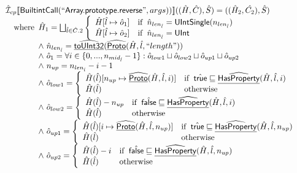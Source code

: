 \documentclass{article}
\newcommand{\SF}[1]{\mbox{\textsf{#1}}}
\newcommand{\wherec}[1]{{\rm where}\begin{array}[t]{l}#1\end{array}}
\newcommand{\ifc}[1]{{\rm if}\begin{array}[t]{l}#1\end{array}}
\newcommand{\owc}{{\rm otherwise}}
\newcommand{\aI}{\hat{\mathcal{I}}}
\newcommand{\lbr}{\llbracket}
\newcommand{\rbr}{\rrbracket}
\newcommand{\ahf}[1]{\widehat{\underline{\sf #1}}}
\newcommand{\atrue}{\hat{\SF{true}}}
\newcommand{\afalse}{\hat{\SF{false}}}
\begin{document}
\[\begin{array}{ll}
\aI _{cp}\lbr \SF{BuiltintCall}(``\SF{Array.prototype.reverse}",args))\rbr((\hat{H},\hat{C}), \hat{S})
  = ((\hat{H}_2, \hat{C_2}), \hat{S})\\
\quad\wherec{
  \hat{H}_1 = \bigsqcup_{\hat{l} \in \hat{C}.2}  \left\{\begin{array}{ll}
      \hat{H}[\hat{l} \mapsto \hat{o}_1] & \ifc{\hat{n}_{len_{\hat{l}}} = \SF{UIntSingle}(n_{len_{\hat{l}}})}\\
      \hat{H}[\hat{l} \mapsto \hat{o}_2] &  \ifc{\hat{n}_{len_{\hat{l}}} = \SF{UInt}}\\
    \end{array}\right.\\
  \land\ \hat{n}_{len_{\hat{l}}} = \ahf{toUInt32}(\ahf{Proto}(\hat{H}, \hat{l}, ``length"))\\
  \land\ \hat{o}_1 = \forall i \in \{0,..., n_{mid_{\hat{l}}}-1\}: \hat{o}_{low1} \sqcup\hat{o}_{low2} \sqcup\hat{o}_{up1} \sqcup\hat{o}_{up2}\\
  \land\ n_{up} = n_{len_{\hat{l}}} - i - 1\\
  \land\ \hat{o}_{low1} = \left\{\begin{array}{ll}
      \hat{H}(\hat{l})[n_{up} \mapsto \ahf{Proto}(\hat{H}, \hat{l}, i)] & \ifc{\atrue \sqsubseteq \ahf{HasProperty}(\hat{H}, \hat{l}, i)}\\
      \hat{H}(\hat{l}) & \owc
    \end{array}\right.\\
  \land\ \hat{o}_{low2} = \left\{\begin{array}{ll}
      \hat{H}(\hat{l})- n_{up} & \ifc{\afalse \sqsubseteq \ahf{HasProperty}(\hat{H}, \hat{l}, i)}\\
      \hat{H}(\hat{l}) & \owc
    \end{array}\right.\\
  \land\ \hat{o}_{up1} = \left\{\begin{array}{ll}
      \hat{H}(\hat{l})[i \mapsto \ahf{Proto}(\hat{H}, \hat{l}, n_{up})] & \ifc{\atrue \sqsubseteq \ahf{HasProperty}(\hat{H}, \hat{l},  n_{up})}\\
      \hat{H}(\hat{l}) & \owc
    \end{array}\right.\\
  \land\ \hat{o}_{up2} = \left\{\begin{array}{ll}
      \hat{H}(\hat{l}) - i & \ifc{\afalse \sqsubseteq \ahf{HasProperty}(\hat{H}, \hat{l},  n_{up})}\\
      \hat{H}(\hat{l}) & \owc
    \end{array}\right.\\
}
\end{array}\]
\end{document}
